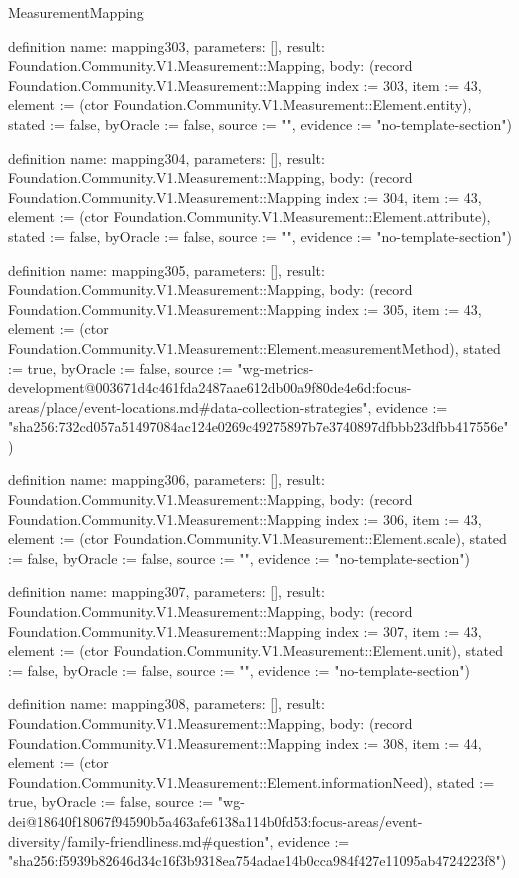 \begin{lexlean}{MeasurementMapping}
\begin{semanticmodule}
definition{
  name: mapping303,
  parameters: [],
  result: Foundation.Community.V1.Measurement::Mapping,
  body: (record Foundation.Community.V1.Measurement::Mapping {index := 303, item := 43, element := (ctor Foundation.Community.V1.Measurement::Element.entity), stated := false, byOracle := false, source := "", evidence := "no-template-section"})
}

definition{
  name: mapping304,
  parameters: [],
  result: Foundation.Community.V1.Measurement::Mapping,
  body: (record Foundation.Community.V1.Measurement::Mapping {index := 304, item := 43, element := (ctor Foundation.Community.V1.Measurement::Element.attribute), stated := false, byOracle := false, source := "", evidence := "no-template-section"})
}

definition{
  name: mapping305,
  parameters: [],
  result: Foundation.Community.V1.Measurement::Mapping,
  body: (record Foundation.Community.V1.Measurement::Mapping {index := 305, item := 43, element := (ctor Foundation.Community.V1.Measurement::Element.measurementMethod), stated := true, byOracle := false, source := "wg-metrics-development@003671d4c461fda2487aae612db00a9f80de4e6d:focus-areas/place/event-locations.md#data-collection-strategies", evidence := "sha256:732cd057a51497084ac124e0269c49275897b7e3740897dfbbb23dfbb417556e"})
}

definition{
  name: mapping306,
  parameters: [],
  result: Foundation.Community.V1.Measurement::Mapping,
  body: (record Foundation.Community.V1.Measurement::Mapping {index := 306, item := 43, element := (ctor Foundation.Community.V1.Measurement::Element.scale), stated := false, byOracle := false, source := "", evidence := "no-template-section"})
}

definition{
  name: mapping307,
  parameters: [],
  result: Foundation.Community.V1.Measurement::Mapping,
  body: (record Foundation.Community.V1.Measurement::Mapping {index := 307, item := 43, element := (ctor Foundation.Community.V1.Measurement::Element.unit), stated := false, byOracle := false, source := "", evidence := "no-template-section"})
}

definition{
  name: mapping308,
  parameters: [],
  result: Foundation.Community.V1.Measurement::Mapping,
  body: (record Foundation.Community.V1.Measurement::Mapping {index := 308, item := 44, element := (ctor Foundation.Community.V1.Measurement::Element.informationNeed), stated := true, byOracle := false, source := "wg-dei@18640f18067f94590b5a463afe6138a114b0fd53:focus-areas/event-diversity/family-friendliness.md#question", evidence := "sha256:f5939b82646d34c16f3b9318ea754adae14b0cca984f427e11095ab4724223f8"})
}


\end{semanticmodule}
\end{lexlean}
